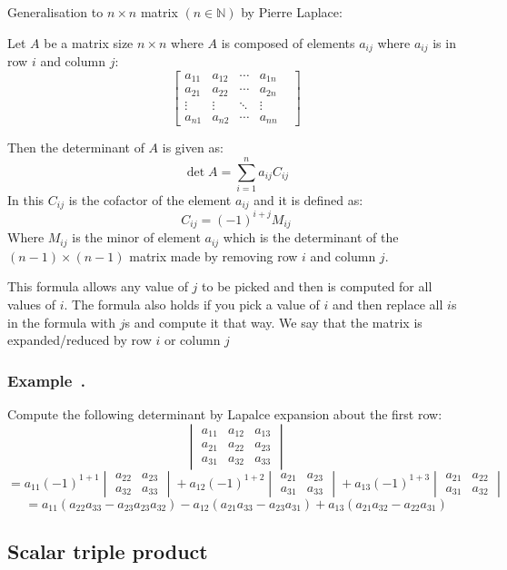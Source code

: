 \documentclass{article}
\newcommand{\bb}[1]{\mathbb{#1}}
\newcounter{example}[section]
\newenvironment{example}[1][]{\refstepcounter{example}\vspace{-0.2cm}
\subsubsection*{Example~\thesection.\theexample} \rmfamily}{\par}
\begin{document}
Generalisation to \(n\times n\) matrix \((n\in\bb N)\) by Pierre Laplace:

Let \(A\) be a matrix size \(n\times n\) where \(A\) is composed of elements \(a_{ij}\) where \(a_{ij}\) is in row \(i\) and column \(j\):
\[
\begin{bmatrix}
a_{11} & a_{12} & \cdots & a_{1n}\\
a_{21} & a_{22} & \cdots & a_{2n}&\\
\vdots &\vdots & \ddots &\vdots &\\
a_{n1} & a_{n2} & \cdots & a_{nn}
\end{bmatrix}
\]

Then the determinant of \(A\) is given as:
\[\det A=\sum_{i=1}^na_{ij}C_{ij}\]
In this \(C_{ij}\) is the cofactor of the element \(a_{ij}\) and it is defined as:
\[C_{ij}=(-1)^{i+j}M_{ij}\]
Where \(M_{ij}\) is the minor of element \(a_{ij}\) which is the determinant of the \((n-1)\times(n-1)\) matrix made by removing row \(i\) and column \(j\).

This formula allows any value of \(j\) to be picked and then is computed for all values of \(i\). The formula also holds if you pick a value of \(i\) and then replace all \(i\)s in the formula with \(j\)s and compute it that way. We say that the matrix is expanded/reduced by row \(i\) or column \(j\)

\begin{example}
Compute the following determinant by Lapalce expansion about the first row:
\[
\begin{vmatrix}
a_{11} & a_{12} & a_{13}\\
a_{21} & a_{22} & a_{23}\\
a_{31} & a_{32} & a_{33}
\end{vmatrix}
\]
\[=a_{11}(-1)^{1+1}
\begin{vmatrix}
a_{22} & a_{23}\\
a_{32} & a_{33}
\end{vmatrix}
+a_{12}(-1)^{1+2}
\begin{vmatrix}
a_{21} & a_{23}\\
a_{31} & a_{33}
\end{vmatrix}
+a_{13}(-1)^{1+3}
\begin{vmatrix}
a_{21} & a_{22}\\
a_{31} & a_{32}
\end{vmatrix}
\]
\[=a_{11}(a_{22}a_{33}-a_{23}a_{23}a_{32})-a_{12}(a_{21}a_{33}-a_{23}a_{31})+a_{13}(a_{21}a_{32}-a_{22}a_{31})\]
\end{example}
\subsection*{Scalar triple product}
\end{document}
